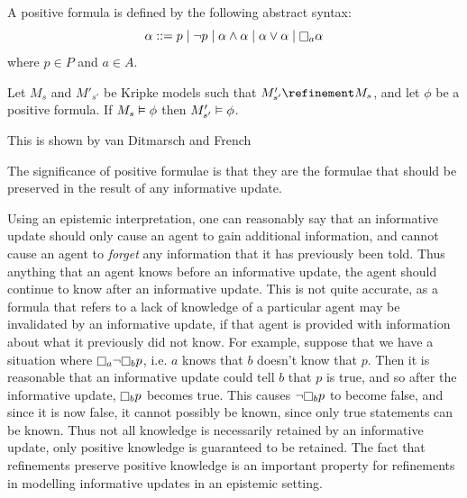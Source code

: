 \begin{definition}
A positive formula is defined by the following abstract syntax:
$$
\alpha ::=    p \bnfalt 
            \neg p \bnfalt
            \alpha \land \alpha \bnfalt
            \alpha \lor \alpha \bnfalt
            \knows_a \alpha
$$
where $p \in P$ and $a \in A$.
\end{definition}

\begin{proposition}\label{pre-positive}
Let $M_s$ and $M'_{s'}$ be Kripke models such that $M'_{s'} \refinement M_s$,
and let $\phi$ be a positive formula. If $M_s \vDash \phi$ then $M'_{s'}
\vDash \phi$. 
\end{proposition}

This is shown by van Ditmarsch and French~\cite{french2009simulation}

The significance of positive formulae is that they are the formulae that should
be preserved in the result of any informative update.

Using an epistemic interpretation, one can reasonably say that an informative
update should only cause an agent to gain additional information, and cannot
cause an agent to {\em forget} any information that it has previously been told.
Thus anything that an agent knows before an informative update, the agent should
continue to know after an informative update. This is not quite accurate, as a
formula that refers to a lack of knowledge of a particular agent may be
invalidated by an informative update, if that agent is provided with information
about what it previously did not know.  For example, suppose that we have a
situation where $\knows_a \neg \knows_b p$, i.e. $a$ knows that $b$ doesn't know
that $p$. Then it is reasonable that an informative update could tell $b$ that
$p$ is true, and so after the informative update, $\knows_b p$ becomes true.
This causes $\neg \knows_b p$ to become false, and since it is now false, it
cannot possibly be known, since only true statements can be known.  Thus not all
knowledge is necessarily retained by an informative update, only positive
knowledge is guaranteed to be retained. The fact that refinements preserve
positive knowledge is an important property for refinements in modelling
informative updates in an epistemic setting.

